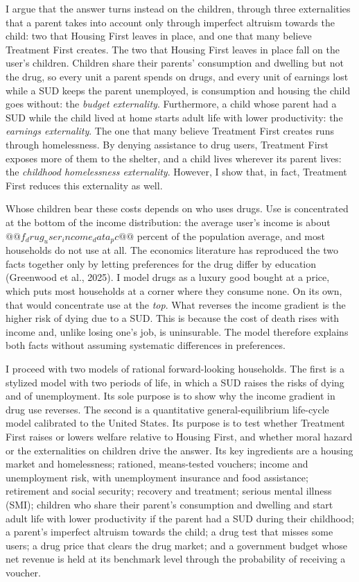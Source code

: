 \documentclass[10pt]{article}
\begin{document}
I argue that the answer turns instead on the children, through three externalities that a parent takes into account only through imperfect altruism towards the child: two that Housing First leaves in place, and one that many believe Treatment First creates. The two that Housing First leaves in place fall on the user's children. Children share their parents' consumption and dwelling but not the drug, so every unit a parent spends on drugs, and every unit of earnings lost while a SUD keeps the parent unemployed, is consumption and housing the child goes without: the \emph{budget externality}. Furthermore, a child whose parent had a SUD while the child lived at home starts adult life with lower productivity: the \emph{earnings externality}. The one that many believe Treatment First creates runs through homelessness. By denying assistance to drug users, Treatment First exposes more of them to the shelter, and a child lives wherever its parent lives: the \emph{childhood homelessness externality}. However, I show that, in fact, Treatment First reduces this externality as well.

Whose children bear these costs depends on who uses drugs. Use is concentrated at the bottom of the income distribution: the average user's income is about $@@f_drug_user_income_data_pc@@$ percent of the population average, and most households do not use at all. The economics literature has reproduced the two facts together only by letting preferences for the drug differ by education (Greenwood et al., 2025). I model drugs as a luxury good bought at a price, which puts most households at a corner where they consume none. On its own, that would concentrate use at the \emph{top}.  What reverses the income gradient is the higher risk of dying due to a SUD. This is because the cost of death rises with income and, unlike losing one's job, is uninsurable. The model therefore explains both facts without assuming systematic differences in preferences.

I proceed with two models of rational forward-looking households. The first is a stylized model with two periods of life, in which a SUD raises the risks of dying and of unemployment. Its sole purpose is to show why the income gradient in drug use reverses. The second is a quantitative general-equilibrium life-cycle model calibrated to the United States. Its purpose is to test whether Treatment First raises or lowers welfare relative to Housing First, and whether moral hazard or the externalities on children drive the answer. Its key ingredients are a housing market and homelessness; rationed, means-tested vouchers; income and unemployment risk, with unemployment insurance and food assistance; retirement and social security; recovery and treatment; serious mental illness (SMI); children who share their parent's consumption and dwelling and start adult life with lower productivity if the parent had a SUD during their childhood; a parent's imperfect altruism towards the child; a drug test that misses some users; a drug price that clears the drug market; and a government budget whose net revenue is held at its benchmark level through the probability of receiving a voucher.
\end{document}
